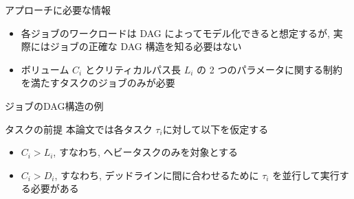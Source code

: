 \begin{frame}{アプローチに必要な情報}
    \begin{itemize}
        \item 各ジョブのワークロードは DAG によってモデル化できると想定するが, 実際にはジョブの正確な DAG 構造を知る必要はない
        \item ボリューム $C_{i}$ とクリティカルパス長 $L_{i}$ の 2 つのパラメータに関する制約を満たすタスクのジョブのみが必要
    \end{itemize}
\end{frame}

\begin{frame}{ジョブのDAG構造の例}
\end{frame}

\begin{frame}{タスクの前提}
    本論文では各タスク $\tau_i$に対して以下を仮定する
    \begin{itemize}
        \item $C_{i}>L_{i}$, すなわち, ヘビータスクのみを対象とする
        \item $C_{i}>D_{i}$, すなわち, デッドラインに間に合わせるために $\tau_{i}$ を並行して実行する必要がある
    \end{itemize}
\end{frame}
